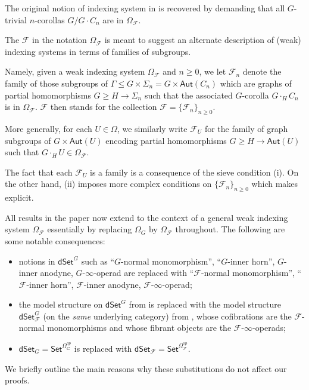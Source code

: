 \documentclass[a4paper,10pt
,draft
]{article}%
\begin{document}
\begin{remark}
The original notion of indexing system 
in \cite[Def. 3.22]{BH15} is recovered by demanding that all
$G$-trivial $n$-corollas $G/G \cdot C_n$ are in 
$\Omega_{\mathcal{F}}$.
\end{remark}


\begin{remark}\label{WHYF REM}
	The $\mathcal{F}$ in the notation $\Omega_{\mathcal{F}}$
is meant to suggest an alternate description of (weak) indexing systems in terms of families of subgroups.

Namely, given a weak indexing system $\Omega_{\mathcal{F}}$ and $n \geq 0$, we let $\mathcal{F}_n$
denote the family of those subgroups 
of $\Gamma \leq G \times \Sigma_n = G \times \mathsf{Aut}(C_n)$ which are graphs of partial homomorphisms
	$G \geq H \to \Sigma_n$
	such that the associated $G$-corolla $G\cdot_H C_n$ is in $\Omega_{\mathcal{F}}$.
	$\mathcal{F}$ then stands for the collection
	$\mathcal{F} = \{\mathcal{F}_{n}\}_{n \geq 0}$.

More generally, for each $U \in \Omega$, we similarly write
$\mathcal{F}_U$
for the family of graph subgroups of $G \times \mathsf{Aut}(U)$ encoding partial homomorphisms 
$G \geq H \to \mathsf{Aut}(U)$ such that
$G \cdot_H U \in \Omega_{\mathcal{F}}$.


The fact that each $\mathcal{F}_U$ is a family is a consequence of the sieve condition (i).
On the other hand, (ii) imposes more complex conditions on $\{\mathcal{F}_{n}\}_{n \geq 0}$
which \cite[Def. 3.22]{BH15} makes explicit.
\end{remark}


All results in the paper now extend to the context of a general weak indexing system $\Omega_{\mathcal{F}}$
essentially by replacing $\Omega_G$ by $\Omega_{\mathcal{F}}$ throughout. The following are some notable consequences:
\begin{itemize}
\item notions in $\mathsf{dSet}^G$ such as 
	``$G$-normal monomorphism'', ``$G$-inner horn'', $G$-inner anodyne, $G$-$\infty$-operad are replaced with
	``$\mathcal{F}$-normal monomorphism'', ``$\mathcal{F}$-inner horn'', $\mathcal{F}$-inner anodyne, $\mathcal{F}$-$\infty$-operad;
\item the model structure on $\mathsf{dSet}^G$ from 
\cite[Thm. 2.1]{Per17} is replaced with the model structure
$\mathsf{dSet}^G_{\mathcal{F}}$ (on the \textit{same} underlying category) from 
\cite[Thm. 2.2]{Per17},
whose cofibrations are the $\mathcal{F}$-normal monomorphisms
and whose fibrant objects are the $\mathcal{F}$-$\infty$-operads;
\item $\mathsf{dSet}_G = \mathsf{Set}^{\Omega_G^{op}}$ is replaced with
	$\mathsf{dSet}_{\mathcal{F}} = \mathsf{Set}^{\Omega_{\mathcal{F}}^{op}}$.
\end{itemize}
We briefly outline the main reasons why these substitutions do not affect our proofs.
\end{document}
